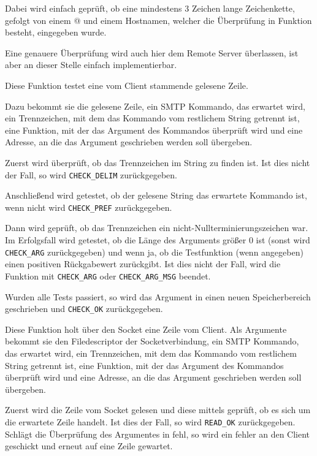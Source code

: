 Dabei wird einfach gepr\"{u}ft, ob eine mindestens 3 Zeichen lange Zeichenkette, gefolgt von einem @ und einem Hostnamen, welcher die \"{U}berpr\"{u}fung in Funktion  besteht, eingegeben wurde.

Eine genauere \"{U}berpr\"{u}fung wird auch hier dem Remote Server \"{u}berlassen, ist aber an dieser Stelle einfach implementierbar.

\label{fn:check_input}
Diese Funktion testet eine vom Client stammende gelesene Zeile.

Dazu bekommt sie die gelesene Zeile, ein SMTP Kommando, das erwartet wird, ein Trennzeichen, mit dem das Kommando vom restlichem String getrennt ist, eine Funktion, mit der das Argument des Kommandos \"{u}berpr\"{u}ft wird und eine Adresse, an die das Argument geschrieben werden soll \"{u}bergeben.

Zuerst wird \"{u}berpr\"{u}ft, ob das Trennzeichen im String zu finden ist. Ist dies nicht der Fall, so wird \texttt{CHECK\_DELIM} zur\"{u}ckgegeben.

Anschließend wird getestet, ob der gelesene String das erwartete Kommando ist, wenn nicht wird \texttt{CHECK\_PREF} zur\"{u}ckgegeben.

Dann wird gepr\"{u}ft, ob das Trennzeichen ein nicht-Nullterminierungszeichen war. Im Erfolgsfall wird getestet, ob die L\"{a}nge des Arguments gr\"{o}ßer 0 ist (sonst wird \texttt{CHECK\_ARG} zur\"{u}ckgegeben) und wenn ja, ob die Testfunktion (wenn angegeben) einen positiven R\"{u}ckgabewert zur\"{u}ckgibt. Ist dies nicht der Fall, wird die Funktion mit \texttt{CHECK\_ARG} oder \texttt{CHECK\_ARG\_MSG} beendet.

Wurden alle Tests passiert, so wird das Argument in einen neuen Speicherbereich geschrieben und \texttt{CHECK\_OK} zur\"{u}ckgegeben.

\label{fn:fetch_input_line}
Diese Funktion holt \"{u}ber den Socket eine Zeile vom Client. Als Argumente bekommt sie den Filedescriptor der Socketverbindung, ein SMTP Kommando, das erwartet wird, ein Trennzeichen, mit dem das Kommando vom restlichem String getrennt ist, eine Funktion, mit der das Argument des Kommandos \"{u}berpr\"{u}ft wird und eine Adresse, an die das Argument geschrieben werden soll \"{u}bergeben.

Zuerst wird die Zeile vom Socket gelesen und diese mittels  gepr\"{u}ft, ob es sich um die erwartete Zeile handelt. Ist dies der Fall, so wird \texttt{READ\_OK} zur\"{u}ckgegeben. Schl\"{a}gt die \"{U}berpr\"{u}fung des Argumentes in  fehl, so wird ein fehler an den Client geschickt und erneut auf eine Zeile gewartet.

